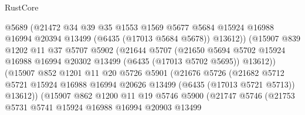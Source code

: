 \begin{lexlean}{RustCore}
\begin{coremodule}
                          @5689
                          (@21472
                            @34
                            @39
                            @35
                            @1553
                            @1569
                            @5677
                            @5684
                            @15924
                            @16988
                            @16994
                            @20394
                            @13499
                            (@6435 (@17013 @5684 @5678))
                            @13612))
                        (@15907
                          @839
                          @1202
                          @11
                          @37
                          @5707
                          @5902
                          (@21644
                            @5707
                            (@21650
                              @5694
                              @5702
                              @15924
                              @16988
                              @16994
                              @20302
                              @13499
                              (@6435 (@17013 @5702 @5695))
                              @13612))
                          (@15907
                            @852
                            @1201
                            @11
                            @20
                            @5726
                            @5901
                            (@21676
                              @5726
                              (@21682
                                @5712
                                @5721
                                @15924
                                @16988
                                @16994
                                @20626
                                @13499
                                (@6435 (@17013 @5721 @5713))
                                @13612))
                            (@15907
                              @862
                              @1200
                              @11
                              @19
                              @5746
                              @5900
                              (@21747
                                @5746
                                (@21753
                                  @5731
                                  @5741
                                  @15924
                                  @16988
                                  @16994
                                  @20903
                                  @13499

\end{coremodule}
\end{lexlean}

